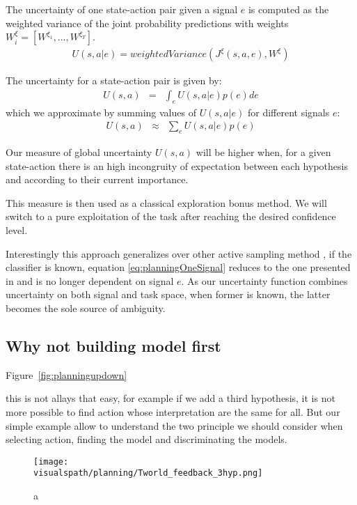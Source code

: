 The uncertainty of one state-action pair given a signal $e$ is computed as the weighted variance of the joint probability predictions with weights $W_{i}^{\xi} = [W^{\xi_1}, \ldots, W^{\xi_T}]$.
\begin{eqnarray}
U(s,a|e) = weightedVariance(J^{\xi}(s,a,e), W^{\xi})
\label{eq:planningOneSignal}
\end{eqnarray}

The uncertainty for a state-action pair is given by:
\begin{eqnarray}
U(s,a) & = & \int_{e} U(s,a|e) p(e) de
\end{eqnarray}
which we approximate by summing values of $U(s,a|e)$ for different signals $e$:
\begin{eqnarray}
U(s,a) & \approx & \sum_{e} U(s,a|e) p(e)
\label{eq:planning}
\end{eqnarray}

Our measure of global uncertainty $U(s,a)$ will be higher when, for a given state-action there is an high incongruity of expectation between each hypothesis and according to their current importance. 

This measure is then used as a classical exploration bonus method. We will switch to a pure exploitation of the task after reaching the desired confidence level.

Interestingly this approach generalizes over other active sampling method \cite{lopes2009active}, if the classifier is known, equation \ref{eq:planningOneSignal} reduces to the one presented in \cite{macl11simul} and is no longer dependent on signal $e$. As our uncertainty function combines uncertainty on both signal and task space, when former is known, the latter becomes the sole source of ambiguity.

\subsection{Why not building model first}

Figure~\ref{fig:planningupdown} 

this is not allays that easy, for example if we add a third hypothesis, it is not more possible to find action whose interpretation are the same for all. But our simple example allow to understand the two principle we should consider when selecting action, finding the model and discriminating the models.

\begin{figure}[!ht]
  \centering
  \texttt{[image: \\visualspath/planning/Tworld\_feedback\_3hyp.png]}
  \caption{a}
  \label{fig:planning3hyp}
\end{figure}

